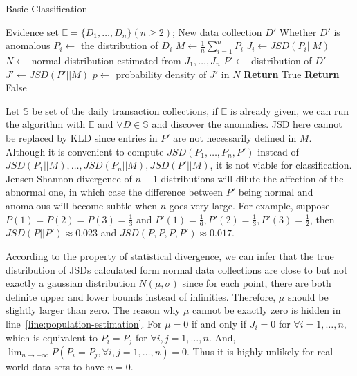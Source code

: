 \documentclass[10pt,conference,letterpaper]{IEEEtran}
\begin{document}
			\begin{algorithm}[!t]
				\caption{Basic Classification}
				\label{alg:static}
				\begin{algorithmic}[1]
					\Require Evidence set $\mathbb{E} = \{D_1, \dots, D_n\}(n\ge2)$; New data collection $D'$
					\Ensure Whether $D'$ is anomalous
					\State $P_i \gets$ the distribution of $D_i$
					\EndFor
					\State $M \gets \frac{1}{n}\sum_{i=1}^{n}P_i$\label{line:population-estimation}
					\State $J_i \gets JSD(P_i||M)$
					\EndFor
					\State $N \gets$ normal distribution estimated from $J_1, \dots, J_n$
					\State $P' \gets$ distribution of $D'$
					\State $J' \gets JSD(P'||M)$
					\State $p \gets$ probability density of $J'$ in $N$
					\State \textbf{Return} True
					\Else
					\State \textbf{Return} False
					\EndIf
				\end{algorithmic}
			\end{algorithm}
	
			Let $\mathbb{S}$ be set of the daily transaction collections, if $\mathbb{E}$ is already given, we can run the algorithm with $\mathbb{E}$ and $\forall D \in \mathbb{S}$ and discover the anomalies. JSD here cannot be replaced by KLD since entries in $P'$ are not necessarily defined in $M$. Although it is convenient to compute $JSD(P_1, \dots, P_n, P')$ instead of $JSD(P_1||M), \dots, JSD(P_n||M), JSD(P'||M)$, it is not viable for classification. Jensen-Shannon divergence of $n+1$ distributions will dilute the affection of the abnormal one, in which case the difference between $P'$ being normal and anomalous will become subtle when $n$ goes very large. For example, suppose $P(1) = P(2) = P(3) = \frac{1}{3}$ and $P'(1) = \frac{1}{6}, P'(2) = \frac{1}{3}, P'(3) = \frac{1}{2}$, then $JSD(P||P') \approx 0.023$ and $JSD(P, P, P, P') \approx 0.017$.
	
			According to the property of statistical divergence, we can infer that the true distribution of JSDs calculated form normal data collections are close to but not exactly a gaussian distribution $N(\mu, \sigma)$ since for each point, there are both definite upper and lower bounds instead of infinities. Therefore, $\mu$ should be slightly larger than zero. The reason why $\mu$ cannot be exactly zero is hidden in line~\ref{line:population-estimation}.
			For $\mu = 0$ if and only if $J_i = 0$ for $\forall i = 1, \dots, n$, which is equivalent to $P_i = P_j$ for $\forall i, j = 1, \dots, n$. And, $\lim_{n\rightarrow+\infty}P(P_i = P_j,\forall i, j = 1, \dots, n)=0$. Thus it is highly unlikely for real world data sets to have $u=0$.
	
\end{document}
